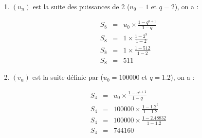 \documentclass[12pt,a4paper]{article}
\begin{document}
\begin{myexs}
	\begin{enumerate}
		\item $(u_n)$ est la suite des puissances de 2 ($u_0 = 1$ et $q = 2$), on a :
		
		\begin{eqnarray*}
			S_8 &=& u_0 \times \frac{1 - q^{8+1}}{1 - q} \\
			S_8 &=& 1 \times \frac{1 - 2^9}{1 - 2} \\
			S_8 &=& 1 \times \frac{1 - 512}{1 - 2} \\
			S_8 &=& 511
		\end{eqnarray*} 
	
		\item $(v_n)$ est la suite définie par ($u_0 = \num{100000}$ et $q = \num{1.2}$), on a :
		
		\begin{eqnarray*}
			S_4 &=& u_0 \times \frac{1 - q^{4+1}}{1 - q} \\
			S_4 &=& \num{100000} \times \frac{1 - \num{1.2}^5}{1 - \num{1.2}} \\
			S_4 &=& \num{100000} \times \frac{1 - \num{2.48832}}{1 - \num{1.2}} \\
			S_4 &=& \num{744160}
		\end{eqnarray*} 
	\end{enumerate}
\end{myexs}
\end{document}
